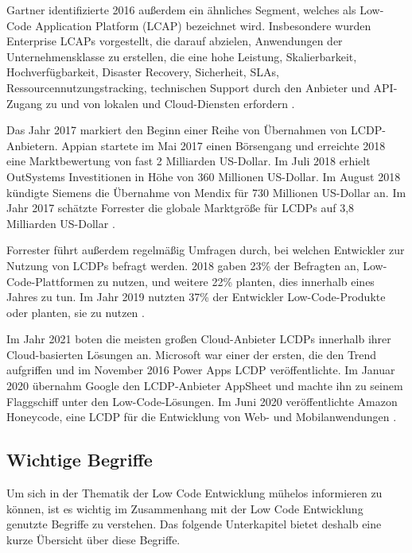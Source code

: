 \documentclass[12pt]{article} %
\begin{document}
	Gartner identifizierte 2016 außerdem ein ähnliches Segment, welches als Low-Code Application Platform (LCAP) bezeichnet wird. Insbesondere wurden Enterprise LCAPs vorgestellt, die darauf abzielen, Anwendungen der Unternehmensklasse zu erstellen, die eine hohe Leistung, Skalierbarkeit, Hochverfügbarkeit, Disaster Recovery, Sicherheit, SLAs, Ressourcennutzungstracking, technischen Support durch den Anbieter und API-Zugang zu und von lokalen und Cloud-Diensten erfordern \autocite{DiRuscio.2022}. \newline %
	
	Das Jahr 2017 markiert den Beginn einer Reihe von Übernahmen von LCDP-Anbietern. Appian startete im Mai 2017 einen Börsengang und erreichte 2018 eine Marktbewertung von fast 2 Milliarden US-Dollar. Im Juli 2018 erhielt OutSystems Investitionen in Höhe von 360 Millionen US-Dollar. Im August 2018 kündigte Siemens die Übernahme von Mendix für 730 Millionen US-Dollar an. Im Jahr 2017 schätzte Forrester die globale Marktgröße für LCDPs auf 3,8 Milliarden US-Dollar \autocite{DiRuscio.2022}. \newline 
		
	Forrester führt außerdem regelmäßig Umfragen durch, bei welchen Entwickler zur Nutzung von LCDPs befragt werden. 2018 gaben 23\% der Befragten an, Low-Code-Plattformen zu nutzen, und weitere 22\% planten, dies innerhalb eines Jahres zu tun. Im Jahr 2019 nutzten 37\% der Entwickler Low-Code-Produkte oder planten, sie zu nutzen \autocite{DiRuscio.2022}.\newline
	
	Im Jahr 2021 boten die meisten großen Cloud-Anbieter LCDPs innerhalb ihrer Cloud-basierten Lösungen an. Microsoft war einer der ersten, die den Trend aufgriffen und im November 2016 Power Apps LCDP veröffentlichte. Im Januar 2020 übernahm Google den LCDP-Anbieter AppSheet und machte ihn zu seinem Flaggschiff unter den Low-Code-Lösungen. Im Juni 2020 veröffentlichte Amazon Honeycode, eine LCDP für die Entwicklung von Web- und Mobilanwendungen \autocite{DiRuscio.2022}.
	
	\subsection{Wichtige Begriffe}
	Um sich in der Thematik der Low Code Entwicklung mühelos informieren zu können, ist es wichtig im Zusammenhang mit der Low Code Entwicklung genutzte Begriffe zu verstehen. Das folgende Unterkapitel bietet deshalb eine kurze Übersicht über diese Begriffe.
	
\end{document}
